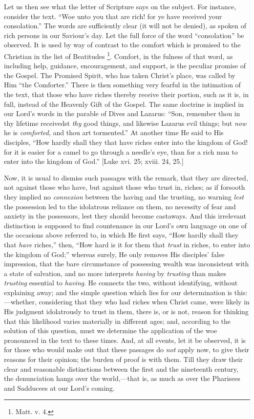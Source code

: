 Let us then see what the letter of Scripture says on the subject. For
instance, consider the text. ``Woe unto you that are rich! for ye
have received your consolation.'' The words are sufficiently clear
(it will not be denied), as spoken of rich persons in our Saviour's day.
Let the full force of the word ``consolation'' be observed. It
is used by way of contrast to the comfort which is promised to the
Christian in the list of Beatitudes \footnote{Matt. v. 4.}. Comfort, in the fulness of that word, as including help,
guidance, encouragement, and support, is the peculiar promise of the
Gospel. The Promised Spirit, who has taken Christ's place, was called by
Him ``the Comforter.'' There is then something very fearful in
the intimation of the text, that those who have riches thereby receive
their portion, such as it is, in full, instead of the Heavenly Gift of
the Gospel. The same doctrine is implied in our Lord's words in the
parable of Dives and Lazarus: ``Son, remember thou in thy lifetime
receivedst \emph{thy} good things, and likewise Lazarus evil things; but
\emph{now} he is \emph{comforted}, and thou art tormented.'' At
another time He said to His disciples, ``How hardly shall they that
have riches enter into the kingdom of God! for it is easier for a camel
to go through a needle's eye, than for a rich man to enter into the
kingdom of God.'' [Luke xvi. 25; xviii. 24, 25.]

Now, it is usual to dismiss such passages with the remark, that they
are directed, not against those who have, but against those who trust
in, riches; as if forsooth they implied no \emph{connexion} between the
having and the trusting, no warning \emph{lest} the possession led to
the idolatrous reliance on them, no necessity of fear and anxiety in the
possessors, lest they should become castaways. And this irrelevant
distinction is supposed to find countenance in our Lord's own language
on one of the occasions above referred to, in which He first says,
``How hardly shall they that \emph{have} riches,'' then, ``How hard is it for them that \emph{trust} in riches, to enter into the
kingdom of God;'' whereas surely, He only removes His disciples'
false impression, that the bare circumstance of possessing wealth was
inconsistent with a state of salvation, and no more interprets \emph{having}
by \emph{trusting} than makes \emph{trusting} essential to \emph{having}.
He connects the two, without identifying, without explaining away; and
the simple question which lies for our determination is this:—whether,
considering that they who had riches when Christ came, were likely in
His judgment idolatrously to trust in them, there is, or is not, reason
for thinking that this likelihood varies materially in different ages;
and, according to the solution of this question, must we determine the
application of the woe pronounced in the text to these times. And, at
all events, let it be observed, it is for those who would make out that
these passages do \emph{not} apply now, to give their reasons for their
opinion; the burden of proof is with them. Till they draw their clear
and reasonable distinctions between the first and the nineteenth
century, the denunciation hangs over the world,—that is, as much as
over the Pharisees and Sadducees at our Lord's coming.

